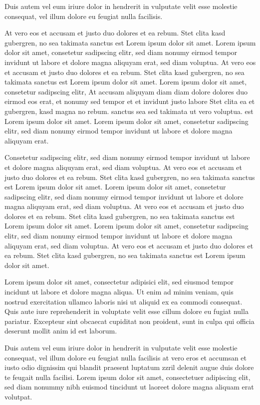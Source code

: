 \documentclass[twoside,a4paper]{article}
\begin{document}
Duis autem vel eum iriure dolor in hendrerit in vulputate velit esse molestie consequat, vel illum dolore eu feugiat nulla facilisis.

At vero eos et accusam et justo duo dolores et ea rebum. Stet clita kasd gubergren, no sea takimata sanctus est Lorem ipsum dolor sit amet. Lorem ipsum dolor sit amet, consetetur sadipscing elitr, sed diam nonumy eirmod tempor invidunt ut labore et dolore magna aliquyam erat, sed diam voluptua. At vero eos et accusam et justo duo dolores et ea rebum. Stet clita kasd gubergren, no sea takimata sanctus est Lorem ipsum dolor sit amet. Lorem ipsum dolor sit amet, consetetur sadipscing elitr, At accusam aliquyam diam diam dolore dolores duo eirmod eos erat, et nonumy sed tempor et et invidunt justo labore Stet clita ea et gubergren, kasd magna no rebum. sanctus sea sed takimata ut vero voluptua. est Lorem ipsum dolor sit amet. Lorem ipsum dolor sit amet, consetetur sadipscing elitr, sed diam nonumy eirmod tempor invidunt ut labore et dolore magna aliquyam erat.

Consetetur sadipscing elitr, sed diam nonumy eirmod tempor invidunt ut labore et dolore magna aliquyam erat, sed diam voluptua. At vero eos et accusam et justo duo dolores et ea rebum. Stet clita kasd gubergren, no sea takimata sanctus est Lorem ipsum dolor sit amet. Lorem ipsum dolor sit amet, consetetur sadipscing elitr, sed diam nonumy eirmod tempor invidunt ut labore et dolore magna aliquyam erat, sed diam voluptua. At vero eos et accusam et justo duo dolores et ea rebum. Stet clita kasd gubergren, no sea takimata sanctus est Lorem ipsum dolor sit amet. Lorem ipsum dolor sit amet, consetetur sadipscing elitr, sed diam nonumy eirmod tempor invidunt ut labore et dolore magna aliquyam erat, sed diam voluptua. At vero eos et accusam et justo duo dolores et ea rebum. Stet clita kasd gubergren, no sea takimata sanctus est Lorem ipsum dolor sit amet.

Lorem ipsum dolor sit amet, consectetur adipisici elit, sed eiusmod tempor incidunt ut labore et dolore magna aliqua. Ut enim ad minim veniam, quis nostrud exercitation ullamco laboris nisi ut aliquid ex ea commodi consequat. Quis aute iure reprehenderit in voluptate velit esse cillum dolore eu fugiat nulla pariatur. Excepteur sint obcaecat cupiditat non proident, sunt in culpa qui officia deserunt mollit anim id est laborum.


Duis autem vel eum iriure dolor in hendrerit in vulputate velit esse molestie consequat, vel illum dolore eu feugiat nulla facilisis at vero eros et accumsan et iusto odio dignissim qui blandit praesent luptatum zzril delenit augue duis dolore te feugait nulla facilisi. Lorem ipsum dolor sit amet, consectetuer adipiscing elit, sed diam nonummy nibh euismod tincidunt ut laoreet dolore magna aliquam erat volutpat.
\end{document}
